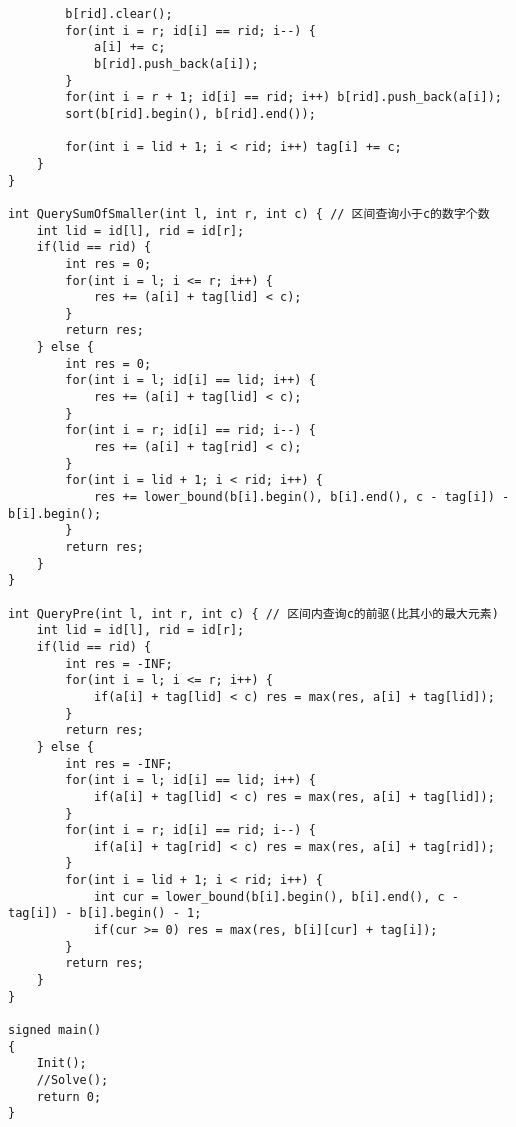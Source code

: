 \begin{lstlisting}
		b[rid].clear();
		for(int i = r; id[i] == rid; i--) {
			a[i] += c;
			b[rid].push_back(a[i]);
		}
		for(int i = r + 1; id[i] == rid; i++) b[rid].push_back(a[i]);
		sort(b[rid].begin(), b[rid].end());
		
		for(int i = lid + 1; i < rid; i++) tag[i] += c;
	}
}

int QuerySumOfSmaller(int l, int r, int c) { // 区间查询小于c的数字个数 
	int lid = id[l], rid = id[r];
	if(lid == rid) {
		int res = 0;
		for(int i = l; i <= r; i++) {
			res += (a[i] + tag[lid] < c);
		}
		return res;
	} else {
		int res = 0;
		for(int i = l; id[i] == lid; i++) {
			res += (a[i] + tag[lid] < c);
		}
		for(int i = r; id[i] == rid; i--) {
			res += (a[i] + tag[rid] < c);
		}
		for(int i = lid + 1; i < rid; i++) {
			res += lower_bound(b[i].begin(), b[i].end(), c - tag[i]) - b[i].begin();
		}
		return res;
	}
}

int QueryPre(int l, int r, int c) { // 区间内查询c的前驱(比其小的最大元素)
	int lid = id[l], rid = id[r];
	if(lid == rid) {
		int res = -INF;
		for(int i = l; i <= r; i++) {
			if(a[i] + tag[lid] < c) res = max(res, a[i] + tag[lid]);
		}
		return res;
	} else {
		int res = -INF;
		for(int i = l; id[i] == lid; i++) {
			if(a[i] + tag[lid] < c) res = max(res, a[i] + tag[lid]);
		}
		for(int i = r; id[i] == rid; i--) {
			if(a[i] + tag[rid] < c) res = max(res, a[i] + tag[rid]);
		}
		for(int i = lid + 1; i < rid; i++) {
			int cur = lower_bound(b[i].begin(), b[i].end(), c - tag[i]) - b[i].begin() - 1;
			if(cur >= 0) res = max(res, b[i][cur] + tag[i]);
		}
		return res;	
	}
}

signed main()
{	
	Init();
	//Solve();
	return 0;
}
\end{lstlisting}

